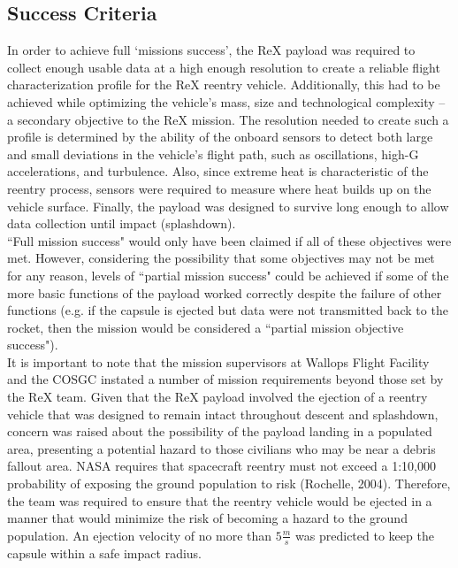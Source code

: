 \documentclass{article}
\begin{document}
\begin{doublespace}
	\subsection{Success Criteria}
		\indent\indent In order to achieve full `missions success', the ReX payload was required to collect enough usable data at a high enough resolution to create a reliable flight characterization profile for the ReX reentry vehicle. Additionally, this had to be achieved while optimizing the vehicle's mass, size and technological complexity -- a secondary objective to the ReX mission. The resolution needed to create such a profile is determined by the ability of the onboard sensors to detect both large and small deviations in the vehicle's flight path, such as oscillations, high-G accelerations, and turbulence. Also, since extreme heat is characteristic of the reentry process, sensors were required to measure where heat builds up on the vehicle surface. Finally, the payload was designed to survive long enough to allow  data collection until impact (splashdown).\\
		\indent ``Full mission success" would only have been claimed if all of these objectives were met. However, considering the possibility that some objectives may not be met for any reason, levels of ``partial mission success" could be achieved if some of the more basic functions of the payload worked correctly despite the failure of other functions (e.g. if the capsule is ejected but data were not transmitted back to the rocket, then the mission would be considered a ``partial mission objective success").\\
		\indent It is important to note that the mission supervisors at Wallops Flight Facility and the COSGC instated a number of mission requirements beyond those set by the ReX team. Given that the ReX payload involved the ejection of a reentry vehicle that was designed to remain intact throughout descent and splashdown, concern was raised about the possibility of the payload landing in a populated area, presenting a potential hazard to those civilians who may be near a debris fallout area. NASA requires that spacecraft reentry must not exceed a 1:10,000 probability of exposing the ground population to risk (Rochelle, 2004). Therefore, the team was required to ensure that the reentry vehicle would be ejected in a manner that would minimize the risk of becoming a hazard to the ground population. An ejection velocity of no more than $5\frac{m}{s}$ was predicted to keep the capsule within a safe impact radius.
		\end{doublespace}
		
\end{document}
